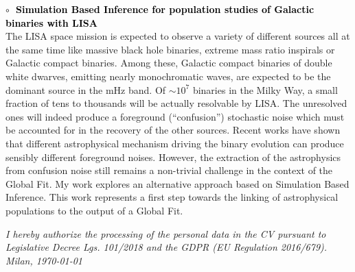 \textbf{\textcolor{black}{\hspace{0.4cm}$\circ\;$ Simulation Based Inference for population studies of Galactic binaries with LISA}}\vspace{0.05cm}\\
\indent The LISA space mission is expected to observe 
a variety of different sources all at the same time like massive black hole binaries, extreme mass ratio inspirals or 
Galactic compact binaries. Among these, Galactic compact binaries of double white dwarves, emitting nearly monochromatic waves, 
are expected to be the dominant source 
in the mHz band. Of $\sim10^7$ binaries in the Milky Way, a small fraction of tens to thousands will be actually resolvable by LISA. 
The unresolved ones will indeed produce a foreground (“confusion”) stochastic noise which must be accounted for in the recovery
of the other sources.
Recent works have shown that different astrophysical mechanism driving the binary evolution can produce sensibly different foreground noises. 
However, the extraction of the astrophysics from confusion noise still remains a non-trivial challenge in the context of the Global Fit.
My work explores an alternative approach based on Simulation Based Inference. This work represents a first step towards 
the linking of astrophysical populations to the output of a Global Fit.

\bigskip

\vfill
\textit{\small I hereby authorize the processing of the personal data in the CV pursuant to Legislative Decree Lgs. 101/2018 and the GDPR (EU Regulation 2016/679).}
\\[1em]
\textit{\small Milan, \today}
\\[0.5em]



